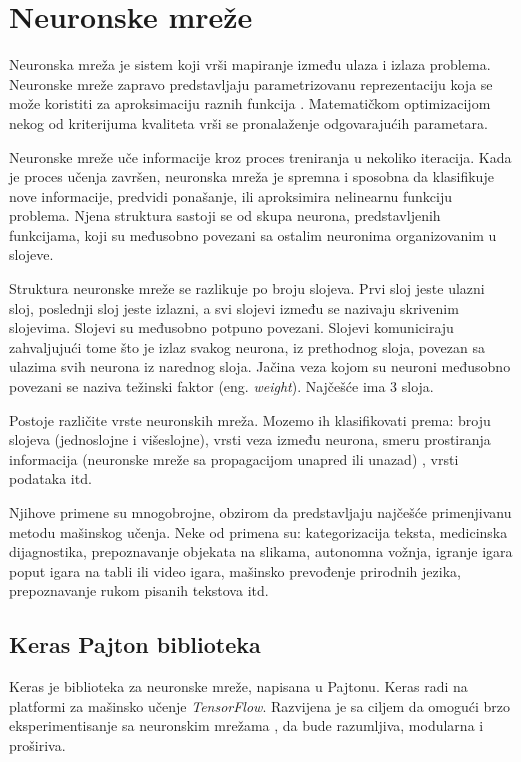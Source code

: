 \documentclass[a4paper]{article}
\begin{document}
\section{Neuronske mreže}
\label{neuronskemreze}

Neuronska mreža je sistem koji vrši mapiranje između ulaza i izlaza problema.
Neuronske mreže zapravo predstavljaju parametrizovanu reprezentaciju koja se može koristiti za aproksimaciju raznih funkcija \cite{hindawi}.
Matematičkom optimizacijom nekog od kriterijuma kvaliteta vrši se pronalaženje odgovarajućih parametara. 

Neuronske mreže uče informacije kroz proces treniranja u nekoliko iteracija. Kada je proces učenja završen, 
neuronska mreža je spremna i sposobna da klasifikuje nove informacije, predvidi ponašanje, ili aproksimira nelinearnu funkciju problema. 
Njena struktura sastoji se od skupa neurona, predstavljenih
funkcijama, koji su međusobno povezani sa ostalim neuronima organizovanim u slojeve. 

Struktura neuronske mreže se razlikuje po broju slojeva. Prvi sloj jeste ulazni sloj, poslednji sloj jeste izlazni, a svi slojevi između se nazivaju skrivenim
slojevima. Slojevi su međusobno potpuno povezani. Slojevi komuniciraju zahvaljujući tome što je izlaz svakog neurona, iz prethodnog sloja, povezan sa
ulazima svih neurona iz narednog sloja. Jačina veza kojom su neuroni međusobno povezani se naziva težinski faktor (eng. \emph{weight}). Najčešće ima
3 sloja.

Postoje različite vrste neuronskih mreža. Mozemo ih klasifikovati prema: broju slojeva (jednoslojne i višeslojne), vrsti veza između neurona, smeru
prostiranja informacija (neuronske mreže sa propagacijom unapred ili unazad) \cite{website}, vrsti podataka itd. 

Njihove primene su mnogobrojne, obzirom da predstavljaju najčešće primenjivanu metodu mašinskog učenja. Neke od primena su: kategorizacija teksta,
medicinska dijagnostika, prepoznavanje objekata na slikama, autonomna vožnja, igranje igara poput igara na tabli ili video igara, mašinsko prevođenje
prirodnih jezika, prepoznavanje rukom pisanih tekstova itd. 

\subsection{Keras Pajton biblioteka}
\label{subsec:keras}

Keras je biblioteka za neuronske mreže, napisana u Pajtonu. Keras radi na platformi za mašinsko učenje  \textit{TensorFlow}.
Razvijena je sa ciljem da omogući brzo eksperimentisanje sa neuronskim mrežama \cite{keraswebsite},
da bude razumljiva, modularna i proširiva.
\end{document}
